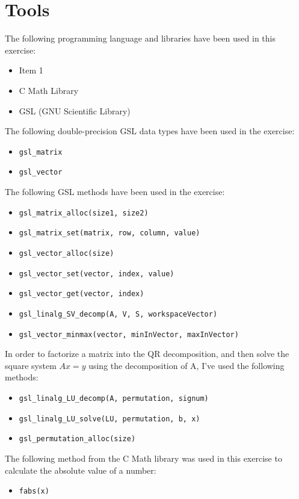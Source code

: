 \documentclass{article}
\newcommand{\code}{\texttt}
\begin{document}
\section{Tools}
The following programming language and libraries have been used in this exercise:
\begin{itemize}
  \item Item 1
  \item C Math Library
  \item GSL (GNU Scientific Library)
\end{itemize}
The following double-precision GSL data types have been used in the exercise:
\begin{itemize}
  \item \code{gsl\_matrix}
  \item \code{gsl\_vector}
\end{itemize}
The following GSL methods have been used in the exercise:
\begin{itemize}
  \item \code{gsl\_matrix\_alloc(size1, size2)}
  \item \code{gsl\_matrix\_set(matrix, row, column, value)}
  \item \code{gsl\_vector\_alloc(size)}
  \item \code{gsl\_vector\_set(vector, index, value)}
  \item \code{gsl\_vector\_get(vector, index)}
  \item \code{gsl\_linalg\_SV\_decomp(A, V, S, workspaceVector)}
  \item \code{gsl\_vector\_minmax(vector, minInVector, maxInVector)}
\end{itemize}
In order to factorize a matrix into the QR decomposition, and then solve the square system $Ax=y$ using the decomposition of A, I've used the following methods:
\begin{itemize}
  \item \code{gsl\_linalg\_LU\_decomp(A, permutation, signum)}
  \item \code{gsl\_linalg\_LU\_solve(LU, permutation, b, x)}
  \item \code{gsl\_permutation\_alloc(size)}
\end{itemize}
The following method from the C Math library was used in this exercise to calculate the absolute value of a number:
\begin{itemize}
  \item \code{fabs(x)}
\end{itemize}
  
\end{document}
